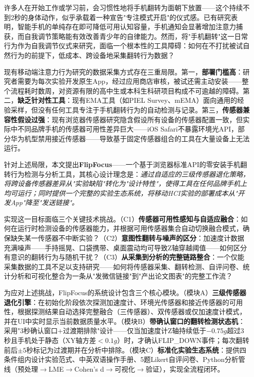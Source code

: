\documentclass[12pt,a4paper]{ctexart}
\begin{document}
许多人在开始工作或学习前，会习惯性地将手机翻转为面朝下放置——这个持续不到2秒的身体动作，似乎承载着一种宣告"专注模式开启"的仪式感。已有研究表明，智能手机的单纯存在即可降低可用认知容量\cite{ward2017brain}，手机通知会显著增加注意力捕获\cite{stothart2015attentional}，而自我调节策略能有效改善青少年的自律能力\cite{duckworth2011self}。然而，将"手机翻转"这一日常行为作为自我调节仪式来研究，面临一个根本性的工具障碍：如何在不打扰被试自然行为的前提下，低成本、跨设备地采集翻转行为数据？

现有移动端注意力行为研究的数据采集方式存在三重局限。第一，\textbf{部署门槛高}：研究者需要为每次实验开发原生App，经过应用商店审核，被试还需主动安装——整个流程耗时数周，对资源有限的高中生或本科生科研项目构成不可逾越的障碍。第二，\textbf{缺乏针对性工具}：现有EMA工具（如PIEL Survey\cite{piel2015}、mEMA）面向通用的经验采样，但没有任何工具专注于手机翻转行为的自动检测与记录。第三，\textbf{传感器兼容性假设过强}：现有浏览器传感器研究\cite{kuijpers2022browser}隐含假设所有设备的传感器配置一致，但实际中不同品牌手机的传感器可用性差异巨大——iOS Safari不暴露环境光API，部分华为机型禁用接近传感器——导致基于固定传感器组合的工具在大量设备上无法运行。

针对上述局限，本文提出\textbf{FlipFocus}——一个基于浏览器标准API的零安装手机翻转行为检测与分析工具，其核心设计理念是：\emph{通过自适应的三级传感器退化策略，将跨设备传感器差异从"实验缺陷"转化为"设计特性"，使得工具在任何品牌手机上均可运行；同时提供一个完整的实验生态系统，将移动HCI实验的部署成本从"开发App"降至"发送链接"。}

实现这一目标面临三个关键技术挑战。（C1）\textbf{传感器可用性感知与自适应融合}：如何在运行时检测设备的传感器能力，并根据可用传感器集合自动切换融合模式，确保缺失某一传感器不中断实验？（C2）\textbf{意图性翻转与噪声的区分}：加速度计数据充满噪声——手持摇晃、口袋携带、桌面震动均可导致Z轴穿越阈值——如何区分有意识的翻转行为与随机干扰？（C3）\textbf{从采集到分析的完整链路整合}：一个仅能采集数据的工具不足以支持研究——如何将传感器采集、翻转检测、自评问卷、统计分析和可视化整合为一条从"发微信链接"到"产出论文图表"的完整工作流？

为应对上述挑战，FlipFocus的系统设计包含三个核心模块。（模块A）\textbf{三级传感器退化引擎}：在初始化阶段依次探测加速度计、环境光传感器和接近传感器的可用性，根据探测结果自动选择完整融合（三传感器）、双传感器或仅加速度计模式，并在UI中实时显示当前数据质量水平。（模块B）\textbf{带确认窗口的翻转检测状态机}：采用"3秒确认窗口+过渡期排除"设计——仅当加速度计Z轴持续低于$-0.75g$超过3秒且手机处于静态（XY轴方差$<0.1g$）时，才确认FLIP\_DOWN事件；每次翻转前后$\pm5$秒标记为过渡期并在分析中排除。（模块C）\textbf{标准化实验生态系统}：提供四条件组内设计实验范式、中英双语操作手册、5题Likert自评问卷、Python分析管线（预处理$\rightarrow$LME$\rightarrow$Cohen's d$\rightarrow$可视化$\rightarrow$验证），实现全流程闭环。
\end{document}
